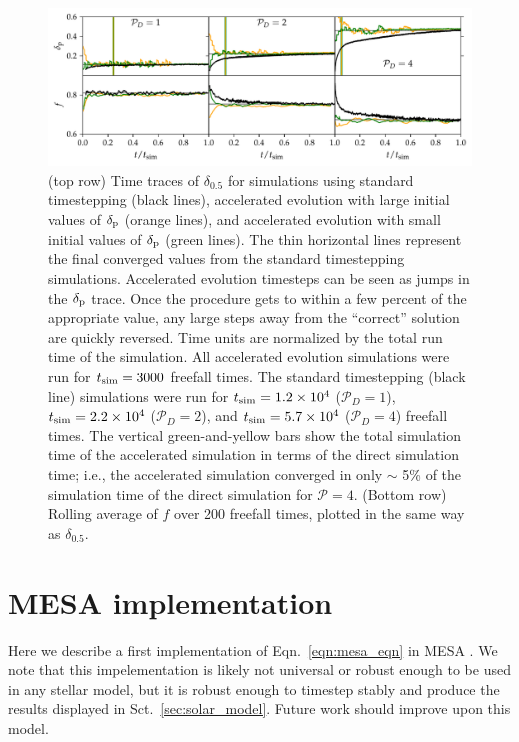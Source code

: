 \documentclass[twocolumn]{aastex631}
\newcommand{\delp}{\ensuremath{\delta_{\rm{p}}}}
\newcommand{\mP}{\ensuremath{\mathcal{P}}}
\begin{document}
\begin{figure}[t]
\centering
\includegraphics[width=\textwidth]{AE_time_figure.pdf}
\caption{
\label{fig:AE_time_figure}
(top row) Time traces of $\delta_{0.5}$ for simulations using standard timestepping (black lines), accelerated evolution with large initial values of $\delp$ (orange lines), and accelerated evolution with small initial values of $\delp$ (green lines).
The thin horizontal lines represent the final converged values from the standard timestepping simulations.
Accelerated evolution timesteps can be seen as jumps in the $\delp$ trace.
Once the procedure gets to within a few percent of the appropriate value, any large steps away from the ``correct'' solution are quickly reversed.
Time units are normalized by the total run time of the simulation.
All accelerated evolution simulations were run for $t_{\rm{sim}} = 3000$ freefall times.
The standard timestepping (black line) simulations were run for $t_{\rm{sim}} = 1.2 \times 10^4$ ($\mP_D = 1$), $t_{\rm{sim}} = 2.2 \times 10^4$ ($\mP_D = 2$), and $t_{\rm{sim}} = 5.7 \times 10^4$ ($\mP_D = 4$) freefall times.
The vertical green-and-yellow bars show the total simulation time of the accelerated simulation in terms of the direct simulation time; i.e., the accelerated simulation converged in only $\sim$ 5\% of the simulation time of the direct simulation for $\mP = 4$.
(Bottom row) Rolling average of $f$ over 200 freefall times, plotted in the same way as $\delta_{0.5}$.
}
\end{figure}





\section{MESA implementation}
\label{app:mesa}
Here we describe a first implementation of Eqn.~\ref{eqn:mesa_eqn} in MESA \citep{paxton_etal_2011, paxton_etal_2013, paxton_etal_2015, paxton_etal_2018, paxton_etal_2019}.
We note that this impelementation is likely not universal or robust enough to be used in any stellar model, but it is robust enough to timestep stably and produce the results displayed in Sct.~\ref{sec:solar_model}.
Future work should improve upon this model.
\end{document}
